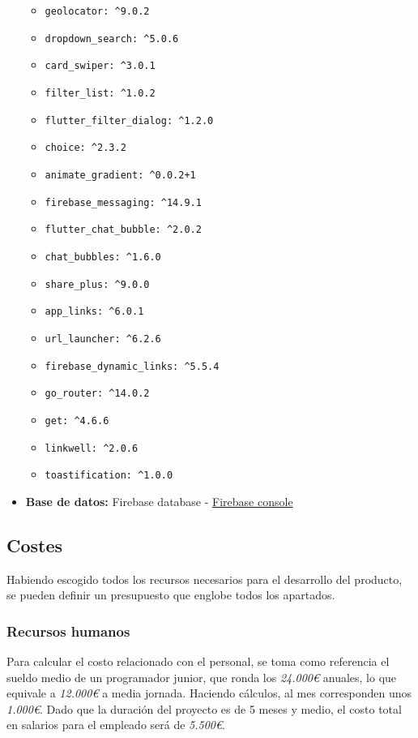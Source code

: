 \documentclass[a4paper, 12pt]{article}
\begin{document}
\begin{itemize}[noitemsep]
\begin{itemize}[noitemsep]
		  \item \texttt{geolocator: \^{}9.0.2}
		  \item \texttt{dropdown\_search: \^{}5.0.6}
		  \item \texttt{card\_swiper: \^{}3.0.1}
		  \item \texttt{filter\_list: \^{}1.0.2}
		  \item \texttt{flutter\_filter\_dialog: \^{}1.2.0}
		  \item \texttt{choice: \^{}2.3.2}
		  \item \texttt{animate\_gradient: \^{}0.0.2+1}
		  \item \texttt{firebase\_messaging: \^{}14.9.1}
		  \item \texttt{flutter\_chat\_bubble: \^{}2.0.2}
		  \item \texttt{chat\_bubbles: \^{}1.6.0}
		  \item \texttt{share\_plus: \^{}9.0.0}
		  \item \texttt{app\_links: \^{}6.0.1}
		  \item \texttt{url\_launcher: \^{}6.2.6}
		  \item \texttt{firebase\_dynamic\_links: \^{}5.5.4}
		  \item \texttt{go\_router: \^{}14.0.2}
		  \item \texttt{get: \^{}4.6.6}
		  \item \texttt{linkwell: \^{}2.0.6}
		  \item \texttt{toastification: \^{}1.0.0}
		\end{itemize}
	\item \textbf{Base de datos:} Firebase database - \href{https://console.firebase.google.com}{Firebase console} \cite{firebase_console}
\end{itemize}


\subsection{Costes}

Habiendo escogido todos los recursos necesarios para el desarrollo del producto, se pueden definir un presupuesto que englobe todos los apartados.

\subsubsection{Recursos humanos}

Para calcular el costo relacionado con el personal, se toma como referencia el sueldo medio de un programador junior, que ronda los \textit{24.000€} anuales, lo que equivale a \textit{12.000€} a media jornada. Haciendo cálculos, al mes corresponden unos \textit{1.000€}. Dado que la duración del proyecto es de 5 meses y medio, el costo total en salarios para el empleado será de \textit{5.500€}.
\end{document}
